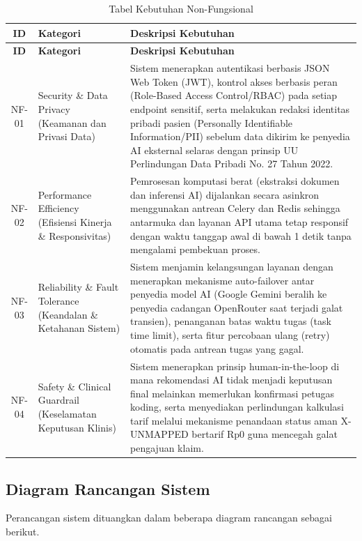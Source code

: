 \begin{small}
\begin{longtable}{|c|>{\raggedright\arraybackslash}p{3.8cm}|>{\raggedright\arraybackslash}p{7.7cm}|}
\caption{Tabel Kebutuhan Non-Fungsional}\label{tab:kebutuhan-non-fungsional}\\
\hline
\textbf{ID} & \textbf{Kategori} & \textbf{Deskripsi Kebutuhan} \\
\hline
\endfirsthead
\hline
\textbf{ID} & \textbf{Kategori} & \textbf{Deskripsi Kebutuhan} \\
\hline
\endhead
\hline
\endfoot
NF-01 & Security \& Data Privacy (Keamanan dan Privasi Data) & Sistem menerapkan autentikasi berbasis JSON Web Token (JWT), kontrol akses berbasis peran (Role-Based Access Control/RBAC) pada setiap endpoint sensitif, serta melakukan redaksi identitas pribadi pasien (Personally Identifiable Information/PII) sebelum data dikirim ke penyedia AI eksternal selaras dengan prinsip UU Perlindungan Data Pribadi No. 27 Tahun 2022. \\ \hline
NF-02 & Performance Efficiency (Efisiensi Kinerja \& Responsivitas) & Pemrosesan komputasi berat (ekstraksi dokumen dan inferensi AI) dijalankan secara asinkron menggunakan antrean Celery dan Redis sehingga antarmuka dan layanan API utama tetap responsif dengan waktu tanggap awal di bawah 1 detik tanpa mengalami pembekuan proses. \\ \hline
NF-03 & Reliability \& Fault Tolerance (Keandalan \& Ketahanan Sistem) & Sistem menjamin kelangsungan layanan dengan menerapkan mekanisme auto-failover antar penyedia model AI (Google Gemini beralih ke penyedia cadangan OpenRouter saat terjadi galat transien), penanganan batas waktu tugas (task time limit), serta fitur percobaan ulang (retry) otomatis pada antrean tugas yang gagal. \\ \hline
NF-04 & Safety \& Clinical Guardrail (Keselamatan Keputusan Klinis) & Sistem menerapkan prinsip human-in-the-loop di mana rekomendasi AI tidak menjadi keputusan final melainkan memerlukan konfirmasi petugas koding, serta menyediakan perlindungan kalkulasi tarif melalui mekanisme penandaan status aman X-UNMAPPED bertarif Rp0 guna mencegah galat pengajuan klaim. \\ \hline
\end{longtable}
\end{small}

\subsection{Diagram Rancangan Sistem}
Perancangan sistem dituangkan dalam beberapa diagram rancangan sebagai berikut.

